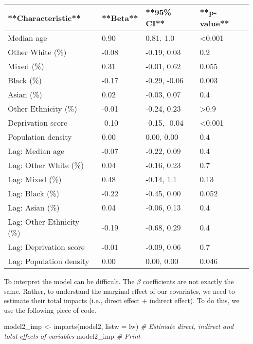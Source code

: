 \documentclass[
]{book}
\newenvironment{Shaded}{\begin{snugshade}}{\end{snugshade}}
\newcommand{\AttributeTok}[1]{\textcolor[rgb]{0.77,0.63,0.00}{#1}}
\newcommand{\CommentTok}[1]{\textcolor[rgb]{0.56,0.35,0.01}{\textit{#1}}}
\newcommand{\FunctionTok}[1]{\textcolor[rgb]{0.00,0.00,0.00}{#1}}
\newcommand{\NormalTok}[1]{#1}
\newcommand{\OtherTok}[1]{\textcolor[rgb]{0.56,0.35,0.01}{#1}}
\begin{document}
\begin{tabular}{l|l|l|l}
\hline
**Characteristic** & **Beta** & **95\% CI** & **p-value**\\
\hline
Median age & 0.90 & 0.81, 1.0 & <0.001\\
\hline
Other White (\%) & -0.08 & -0.19, 0.03 & 0.2\\
\hline
Mixed (\%) & 0.31 & -0.01, 0.62 & 0.055\\
\hline
Black (\%) & -0.17 & -0.29, -0.06 & 0.003\\
\hline
Asian (\%) & 0.02 & -0.03, 0.07 & 0.4\\
\hline
Other Ethnicity (\%) & -0.01 & -0.24, 0.23 & >0.9\\
\hline
Deprivation score & -0.10 & -0.15, -0.04 & <0.001\\
\hline
Population density & 0.00 & 0.00, 0.00 & 0.4\\
\hline
Lag: Median age & -0.07 & -0.22, 0.09 & 0.4\\
\hline
Lag: Other White (\%) & 0.04 & -0.16, 0.23 & 0.7\\
\hline
Lag: Mixed (\%) & 0.48 & -0.14, 1.1 & 0.13\\
\hline
Lag: Black (\%) & -0.22 & -0.45, 0.00 & 0.052\\
\hline
Lag: Asian (\%) & 0.04 & -0.06, 0.13 & 0.4\\
\hline
Lag: Other Ethnicity (\%) & -0.19 & -0.68, 0.29 & 0.4\\
\hline
Lag: Deprivation score & -0.01 & -0.09, 0.06 & 0.7\\
\hline
Lag: Population density & 0.00 & 0.00, 0.00 & 0.046\\
\hline
\end{tabular}

To interpret the model can be difficult. The \(\beta\) coefficients are not exactly the same. Rather, to understand the marginal effect of our covariates, we need to estimate their total impacts (i.e., direct effect + indirect effect). To do this, we use the following piece of code.

\begin{Shaded}
\begin{Highlighting}[]
\NormalTok{model2\_imp }\OtherTok{\textless{}{-}} \FunctionTok{impacts}\NormalTok{(model2, }\AttributeTok{listw =}\NormalTok{ lw) }\CommentTok{\# Estimate direct, indirect and total effects of variables}
\NormalTok{model2\_imp }\CommentTok{\# Print}
\end{Highlighting}
\end{Shaded}
\end{document}
